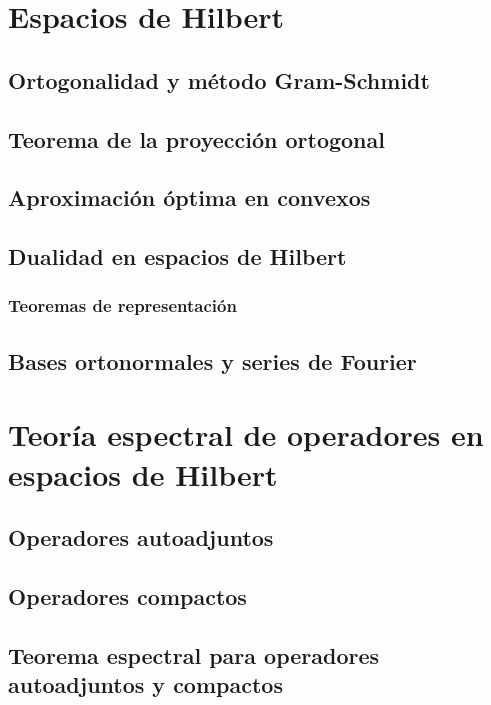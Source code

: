 \documentclass[palatino]{apuntes}
\begin{document}
\chapter{Espacios de Hilbert}

\section{Ortogonalidad y método Gram-Schmidt}

\section{Teorema de la proyección ortogonal}

\section{Aproximación óptima en convexos}

\section{Dualidad en espacios de Hilbert}

\subsection{Teoremas de representación}

\section{Bases ortonormales y series de Fourier}

\chapter{Teoría espectral de operadores en espacios de Hilbert}

\section{Operadores autoadjuntos}

\section{Operadores compactos}

\section{Teorema espectral para operadores autoadjuntos y compactos}
\end{document}
